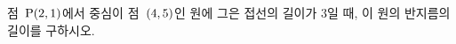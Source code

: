 점~$\mathrm{P}(2{,}\mkern3mu\mathopen{}1)$에서 중심이 점~$(4{,}\mkern3mu\mathopen{}5)$인 원에 그은 접선의 길이가 $3$일 때, 이 원의 반지름의 길이를 구하시오.
